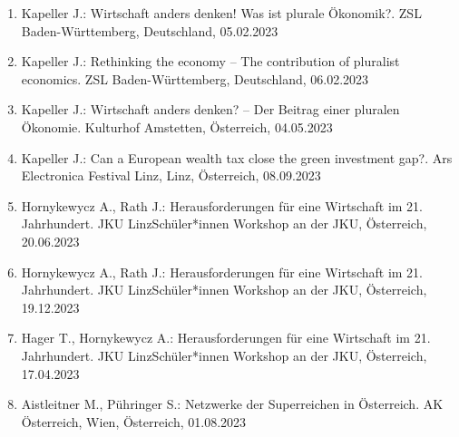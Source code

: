 \begin{enumerate}
	\item Kapeller J.: Wirtschaft anders denken! Was ist plurale Ökonomik?. ZSL Baden-Württemberg, Deutschland, 05.02.2023
	\item Kapeller J.: Rethinking the economy – The contribution of pluralist economics. ZSL Baden-Württemberg, Deutschland, 06.02.2023
	\item Kapeller J.: Wirtschaft anders denken? – Der Beitrag einer pluralen Ökonomie. Kulturhof Amstetten, Österreich, 04.05.2023
	\item Kapeller J.: Can a European wealth tax close the green investment gap?. Ars Electronica Festival Linz, Linz, Österreich, 08.09.2023
	\item Hornykewycz A., Rath J.: Herausforderungen für eine Wirtschaft im 21. Jahrhundert. JKU LinzSchüler*innen Workshop an der JKU, Österreich, 20.06.2023
	\item Hornykewycz A., Rath J.: Herausforderungen für eine Wirtschaft im 21. Jahrhundert. JKU LinzSchüler*innen Workshop an der JKU, Österreich, 19.12.2023
	\item Hager T., Hornykewycz A.: Herausforderungen für eine Wirtschaft im 21. Jahrhundert. JKU LinzSchüler*innen Workshop an der JKU, Österreich, 17.04.2023
	\item Aistleitner M., Pühringer S.: Netzwerke der Superreichen in Österreich. AK Österreich, Wien, Österreich, 01.08.2023
\end{enumerate}

